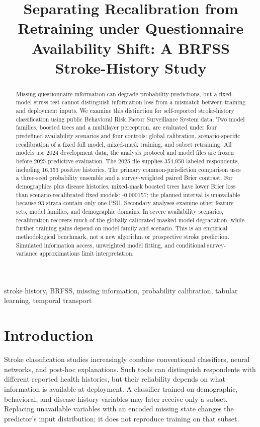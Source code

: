 \documentclass[conference,letterpaper]{IEEEtran}
\begin{document}
\title{Separating Recalibration from Retraining under Questionnaire Availability Shift: A BRFSS Stroke-History Study}
\author{}
\maketitle
\begin{abstract}
Missing questionnaire information can degrade probability predictions, but a fixed-model stress test cannot distinguish information loss from a mismatch between training and deployment inputs. We examine this distinction for self-reported stroke-history classification using public Behavioral Risk Factor Surveillance System data. Two model families, boosted trees and a multilayer perceptron, are evaluated under four predefined availability scenarios and four controls: global calibration, scenario-specific recalibration of a fixed full model, mixed-mask training, and subset retraining. All models use 2024 development data; the analysis protocol and model files are frozen before 2025 predictive evaluation. The 2025 file supplies 354,950 labeled respondents, including 16,353 positive histories. The primary common-jurisdiction comparison uses a three-seed probability ensemble and a survey-weighted paired Brier contrast. For demographics plus disease histories, mixed-mask boosted trees have lower Brier loss than scenario-recalibrated fixed models: -0.000157; the planned interval is unavailable because 93 strata contain only one PSU. Secondary analyses examine other feature sets, model families, and demographic domains. In severe availability scenarios, recalibration recovers much of the globally calibrated masked-model degradation, while further training gains depend on model family and scenario. This is an empirical methodological benchmark, not a new algorithm or prospective stroke prediction. Simulated information access, unweighted model fitting, and conditional survey-variance approximations limit interpretation.
\end{abstract}
\begin{IEEEkeywords}
stroke history, BRFSS, missing information, probability calibration, tabular learning, temporal transport
\end{IEEEkeywords}
\section{Introduction}
Stroke classification studies increasingly combine conventional classifiers, neural networks, and post-hoc explanations. Such tools can distinguish respondents with different reported health histories, but their reliability depends on what information is available at deployment. A classifier trained on demographic, behavioral, and disease-history variables may later receive only a subset. Replacing unavailable variables with an encoded missing state changes the predictor's input distribution; it does not reproduce training on that subset.
\end{document}
